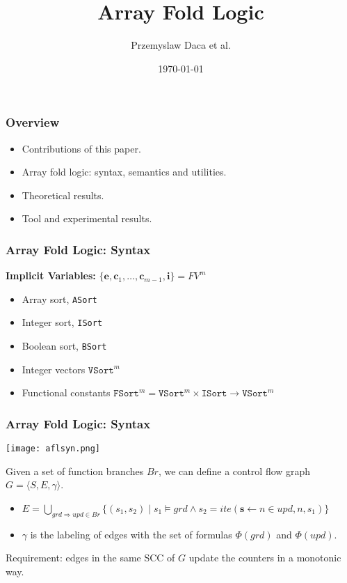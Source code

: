\documentclass[11pt]{beamer}
\title{Array Fold Logic}
\author{Przemyslaw Daca et al.}
\date{\today}
\begin{document}
\maketitle
\begin{frame}\frametitle{Overview }
\begin{itemize}

\item Contributions of this paper.
\item Array fold logic: syntax, semantics and utilities.
\item Theoretical results.
\item Tool and experimental results.

\end{itemize}
\end{frame}


\begin{frame}\frametitle{Array Fold Logic: Syntax}
\textbf{Implicit Variables:} $\{\textbf{e}, \textbf{c}_1, \ldots, \textbf{c}_{m-1}, \textbf{i}\} = FV^{m}$

\begin{itemize}
\item Array sort, \texttt{ASort}
\item Integer sort, \texttt{ISort}
\item Boolean sort, \texttt{BSort}
\item Integer vectors $\texttt{VSort}^m$
\item Functional constants $\texttt{FSort}^m = \texttt{VSort}^m\times \texttt{ISort}\rightarrow \texttt{VSort}^m$
\end{itemize}
\end{frame}

\begin{frame}\frametitle{Array Fold Logic: Syntax}

\begin{center}
\texttt{[image: aflsyn.png]}
\end{center}

Given a set of function branches $Br$, we can define a control flow graph $G =\langle S,E,\gamma \rangle $.
\begin{itemize}
\item $E = \bigcup_{grd\Rightarrow upd \in Br} \{(s_1, s_2)\mid s_1 \models grd\wedge s_2 = ite(\textbf{s}\leftarrow n\in upd, n, s_1)\}$
\item $\gamma$ is the labeling of edges with the set of formulas $\Phi(grd)$ and $\Phi(upd)$.
\end{itemize}
Requirement: edges in the same SCC of $G$ update the counters in a monotonic way.

\end{frame}
\end{document}
